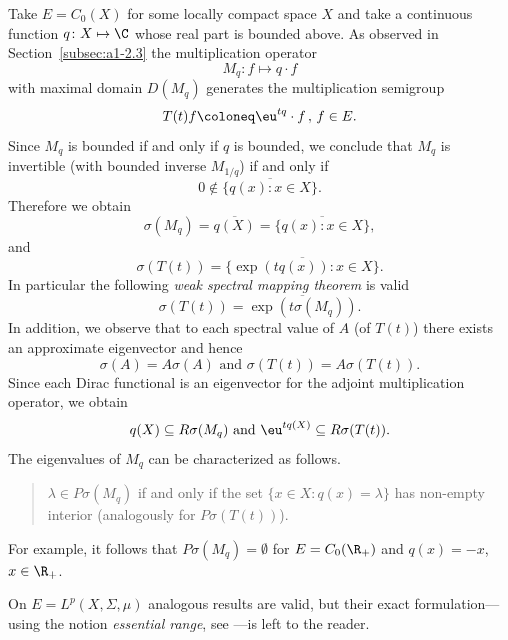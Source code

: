 \begin{example}\label{ex:a3-2.3}%
Take $E = C_{0}(X)$ for some locally compact space $X$ and take a continuous function $q \colon X \mapsto \C$ whose real part is bounded above.
As observed in Section~\ref{subsec:a1-2.3} the multiplication operator
\[
M_{q} \colon f \mapsto q \cdot f
\]
with maximal domain $D(M_{q})$ generates the multiplication semigroup
\[
T(t)f \coloneq \eu^{tq} \cdot f \, , \, f \in E .
\]
Since $M_{q}$ is bounded if and only if\/ $q$ is bounded, we conclude that $M_{q}$ is invertible (with bounded inverse $M_{1/q}$) if and only if
\[
0 \notin \overline{\{q(x)  \colon x \in X\}} .
\]
Therefore we obtain
\[
\sigma(M_{q}) = \overline{q(X)} = \overline{\{q(x) \colon x \in X\}} ,
\]
and
\[
\sigma(T(t)) = \overline{\{\exp(tq(x)) \colon x \in X\}} .
\]
In particular the following \emph{weak spectral mapping theorem}
is valid
\[
\sigma(T(t)) = \overline{\exp(t\sigma(M_{q}))} .
\]
In addition, we observe that to each spectral value of\/ $A$ (\resp of\/ $T(t)$) there exists an approximate eigenvector and hence
\[
\sigma(A) = A\sigma(A) \text{ and } \sigma(T(t)) = A\sigma(T(t)) .
\]
Since each Dirac functional is an eigenvector for the adjoint multiplication operator, we obtain
\[
q(X) \subseteq R\sigma(M_{q}) \text{ and } \eu^{tq(X)} \subseteq R\sigma(T(t)) .
\]
The eigenvalues of\/ $M_{q}$ can be characterized as follows.
\begin{quote}
$\lambda \in P\sigma(M_{q})$ if and only if the set $\{x \in X \colon q(x) = \lambda\}$ has non-empty interior (analogously for $P\sigma(T(t))$).
\end{quote}
For example, it follows that $P\sigma(M_{q}) = \emptyset$ for $E = C_{0}(\R_{+})$ and $q(x) = -x$, $x \in \R_{+}$.

On $E = L^{p}(X,\Sigma,\mu)$ analogous results are valid, but their exact formulation---using the notion \emph{essential range}, see \textcite{goldstein:1985a}---is left to the reader.
\end{example}
